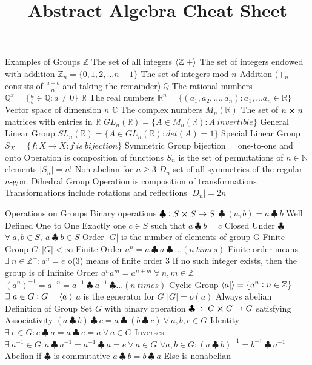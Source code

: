 \documentclass[14pt]{extarticle}
\title{Abstract Algebra Cheat Sheet}
\begin{document}
	\maketitle
	
	\begin{outline}		
		\1	Examples of Groups
			\2	$\mathbb{Z}$ The set of all integers
			\2	$\braket{\mathbb{Z}}{+}$ The set of integers endowed with addition
			\2	$\mathbb{Z}_n = \{0,1,2,...n-1\}$ The set of integers mod $n$
				\3	Addition ($+_n$ consists of $\frac{a + b}{n}$ and taking the remainder)
			\2	$\mathbb{Q}$ The rational numbers
			\2	$\mathbb{Q}^x = \{\frac{a}{b} \in \mathbb{Q} : a \neq 0\}$
			\2	$\mathbb{R}$ The real numbers
			\2	$\mathbb{R}^n = \{(a_1,a_2,...,a_n) : a_1,...a_n \in \mathbb{R} \}$ Vector space of dimension $n$
			\2	$\mathbb{C}$ The complex numbers	
			\2	$M_n(\mathbb{R})$ The set of $n \cross n$ matrices with entries in $\mathbb{R}$
			\2	$GL_n(\mathbb{R}) = \{A \in M_n(\mathbb{R}) : A~invertible\}$ General Linear Group
			\2	$SL_n(\mathbb{R}) = \{A \in GL_n(\mathbb{R}) : det(A) = 1\}$	Special Linear Group
			\2	$S_X = \{f : X \rightarrow X : f~is~bijection\}$ Symmetric Group
				\3	bijection = one-to-one and onto
				\3	Operation is composition of functions
				\3	$S_n$ is the set of permutations of $n \in \mathbb{N}$ elements
					\4	$|S_n| = n!$
					\4	Non-abelian for $n \ge 3$
			\2	$D_n$ set of all symmetries of the regular $n$-gon.  Dihedral Group
				\3	Operation is composition of transformations
				\3	Transformations include rotations and reflections
				\3	$|D_n| = 2n$ 
			
		\1	Operations on Groups
			\2	Binary operations
				\3	$\clubsuit : S \cross S \rightarrow S$
				\3	$\clubsuit~(a,b) = a~\clubsuit~b$
				\3	Well Defined
					\4	One to One
					\4	Exactly one $c \in S$ such that $a~\clubsuit~b = c$
				\3	Closed Under $\clubsuit$
					\4	$\forall~a,b \in S,~a~\clubsuit~b \in S$
			\2	Order $|G|$ is the number of elements of group G
				\3	Finite Group $G : |G| < \infty$
			\2	Finite Order
				\3	$a^n = a~\clubsuit~a~\clubsuit~... (n~times)$
				\3	Finite order means $\exists~n \in \mathbb{Z}^+ : a^n = e$
				\3	o(3) means of finite order 3
				\3	If no such integer exists, then the group is of Infinite Order
				\3	$a^na^m = a^{n+m}~\forall~n,m \in \mathbb{Z}$
				\3	$(a^n)^{-1} = a^{-n} = a^{-1}~\clubsuit~a^{-1}~\clubsuit ... (n~times)$
			\2	Cyclic Group
				\3	$\braket{a}{}	= \{a^n : n \in \mathbb{Z}\}$ 	
				\3	$\exists~a \in G : G = \braket{a}{}$
				\3	$a$ is the generator for $G$
				\3	$|G| = o(a)$
				\3	Always abelian		
		\1	Definition of Group
			\2	Set $G$ with binary operation $\clubsuit~:~G \cross G \rightarrow G$ satisfying
				\3	Associativity
					\4	$(a~\clubsuit~b)~\clubsuit~c = a~\clubsuit~(b~\clubsuit~c)~\forall~a,b,c \in G$
				\3	Identity
					\4	$\exists~e \in G : e~\clubsuit~a = a~\clubsuit~e = a~\forall~a \in G$ 
				\3	Inverses
					\4	$\exists~a^{-1} \in G : a~\clubsuit~ a^{-1} = a^{-1}~\clubsuit~ a = e~\forall~a \in G$
					\4	$\forall a,b \in G : (a~\clubsuit~b)^{-1} = b^{-1}~\clubsuit~ a^{-1}$
			\2 Abelian if $\clubsuit$ is commutative
				\3	$a~\clubsuit~b = b~\clubsuit~a$
				\3	Else is nonabelian
	

\end{outline}
\end{document}
